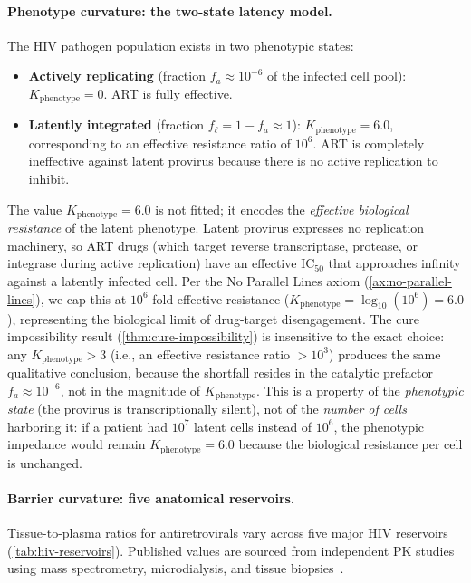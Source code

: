 \documentclass[11pt]{article}
\theoremstyle{plain}
\theoremstyle{definition}
\newcommand{\Kpheno}{K_{\mathrm{phenotype}}}
\begin{document}
\paragraph{Phenotype curvature: the two-state latency model.}
The HIV pathogen population exists in two phenotypic states:
\begin{itemize}
  \item \textbf{Actively replicating} (fraction $f_a \approx
    10^{-6}$ of the infected cell pool): $\Kpheno = 0$.
    ART is fully effective.
  \item \textbf{Latently integrated} (fraction
    $f_\ell = 1 - f_a \approx 1$): $\Kpheno = 6.0$,
    corresponding to an effective resistance ratio of $10^6$.
    ART is completely ineffective against latent provirus
    because there is no active replication to inhibit.
\end{itemize}
The value $\Kpheno = 6.0$ is not fitted; it encodes the
\emph{effective biological resistance} of the latent phenotype.
Latent provirus expresses no replication machinery, so ART drugs
(which target reverse transcriptase, protease, or integrase during
active replication) have an effective $\mathrm{IC}_{50}$ that
approaches infinity against a latently infected cell. Per the No
Parallel Lines axiom (\cref{ax:no-parallel-lines}), we cap this
at $10^6$-fold effective resistance ($\Kpheno = \log_{10}(10^6)
= 6.0$), representing the biological limit of drug-target
disengagement.
The cure impossibility result (\cref{thm:cure-impossibility}) is
insensitive to the exact choice: any $\Kpheno > 3$ (i.e., an
effective resistance ratio $> 10^3$) produces the same qualitative
conclusion, because the shortfall resides in the catalytic
prefactor $f_a \approx 10^{-6}$, not in the magnitude of $\Kpheno$. This is a property of the \emph{phenotypic state}
(the provirus is transcriptionally silent), not of the
\emph{number of cells} harboring it: if a patient had $10^7$
latent cells instead of $10^6$, the phenotypic impedance would
remain $\Kpheno = 6.0$ because the biological resistance per cell
is unchanged.

\paragraph{Barrier curvature: five anatomical reservoirs.}
Tissue-to-plasma ratios for antiretrovirals vary across five
major HIV reservoirs (\cref{tab:hiv-reservoirs}). Published
values are sourced from independent PK studies using mass
spectrometry, microdialysis, and tissue
biopsies~\cite{Fletcher2014, Letendre2010}.
\end{document}
